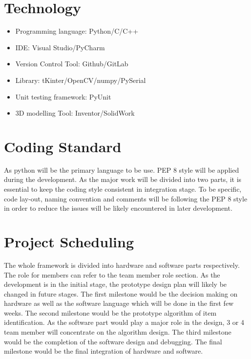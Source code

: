 \documentclass{article}
\begin{document}
\begin{large}
\section{Technology}

\begin{itemize}
\item Programming language: Python/C/C++
\item IDE: Visual Studio/PyCharm
\item Version Control Tool: Github/GitLab
\item Library: tKinter/OpenCV/numpy/PySerial
\item Unit testing framework: PyUnit
\item 3D modelling Tool: Inventor/SolidWork

\end{itemize}

\section{Coding Standard}
\hspace*{0.5cm} As python will be the primary language to be use. PEP 8 style will be applied during the development. As the major work will be divided into two parts, it is essential to keep the coding style consistent in integration stage. To be specific, code lay-out, naming convention and comments will be following the PEP 8 style in order to reduce the issues will be likely encountered in later development.
\section{Project Scheduling}
\hspace*{1cm} The whole framework is divided into hardware and software parts respectively. The role for members can refer to the team member role section. As the development is in the initial stage, the prototype design plan will likely be changed in future stages. The first milestone would be the decision making on hardware as well as the software language which will be done in the first few weeks. The second milestone would be the prototype algorithm of item identification. As the software part would play a major role in the design, 3 or 4 team member will concentrate on the algorithm design. The third milestone would be the completion of the software design and debugging. The final milestone would be the final integration of hardware and software.
\end{large}
\end{document}
